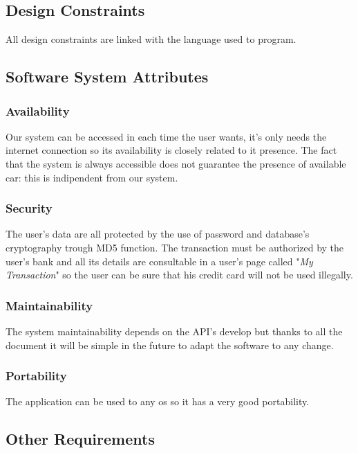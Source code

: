 \subsection{Design Constraints} \label{sec:design_constr}
All design constraints are linked with the language used to program.

\subsection{Software System Attributes} \label{sec:sw_sys_attr}
\subsubsection{Availability} \label{availability}
Our system can be accessed in each time the user wants, it's only needs the internet connection so its availability is closely related to it presence. The fact that the system is always accessible does not guarantee the presence of available car: this is indipendent from our system.

\subsubsection{Security} \label{security}
The user's data are all protected by the use of password and database's cryptography trough MD5 function. The transaction must be authorized by the user's bank and all its details are consultable in a user's page called "\textit{My Transaction}" so the user can be sure that his credit card will not be used illegally.

\subsubsection{Maintainability} \label{maintainability}
The system maintainability depends on the API's develop but thanks to all the document it will be simple in the future to adapt the software to any change.

\subsubsection{Portability} \label{portability}
The application can be used to any \acs{os} so it has a very good portability.

\subsection{Other Requirements} \label{other}
